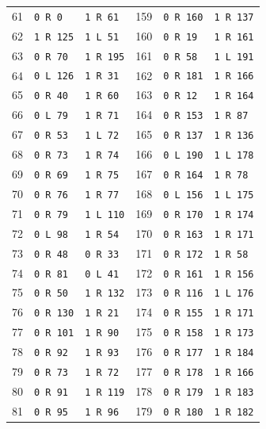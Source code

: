 \begin{longtable}{rll@{\qquad}rll}
61 & \texttt{0 R 0} & \texttt{1 R 61} & 159 & \texttt{0 R 160} & \texttt{1 R 137}\\
62 & \texttt{1 R 125} & \texttt{1 L 51} & 160 & \texttt{0 R 19} & \texttt{1 R 161}\\
63 & \texttt{0 R 70} & \texttt{1 R 195} & 161 & \texttt{0 R 58} & \texttt{1 L 191}\\
64 & \texttt{0 L 126} & \texttt{1 R 31} & 162 & \texttt{0 R 181} & \texttt{1 R 166}\\
65 & \texttt{0 R 40} & \texttt{1 R 60} & 163 & \texttt{0 R 12} & \texttt{1 R 164}\\
66 & \texttt{0 L 79} & \texttt{1 R 71} & 164 & \texttt{0 R 153} & \texttt{1 R 87}\\
67 & \texttt{0 R 53} & \texttt{1 L 72} & 165 & \texttt{0 R 137} & \texttt{1 R 136}\\
68 & \texttt{0 R 73} & \texttt{1 R 74} & 166 & \texttt{0 L 190} & \texttt{1 L 178}\\
69 & \texttt{0 R 69} & \texttt{1 R 75} & 167 & \texttt{0 R 164} & \texttt{1 R 78}\\
70 & \texttt{0 R 76} & \texttt{1 R 77} & 168 & \texttt{0 L 156} & \texttt{1 L 175}\\
71 & \texttt{0 R 79} & \texttt{1 L 110} & 169 & \texttt{0 R 170} & \texttt{1 R 174}\\
72 & \texttt{0 L 98} & \texttt{1 R 54} & 170 & \texttt{0 R 163} & \texttt{1 R 171}\\
73 & \texttt{0 R 48} & \texttt{0 R 33} & 171 & \texttt{0 R 172} & \texttt{1 R 58}\\
74 & \texttt{0 R 81} & \texttt{0 L 41} & 172 & \texttt{0 R 161} & \texttt{1 R 156}\\
75 & \texttt{0 R 50} & \texttt{1 R 132} & 173 & \texttt{0 R 116} & \texttt{1 L 176}\\
76 & \texttt{0 R 130} & \texttt{1 R 21} & 174 & \texttt{0 R 155} & \texttt{1 R 171}\\
77 & \texttt{0 R 101} & \texttt{1 R 90} & 175 & \texttt{0 R 158} & \texttt{1 R 173}\\
78 & \texttt{0 R 92} & \texttt{1 R 93} & 176 & \texttt{0 R 177} & \texttt{1 R 184}\\
79 & \texttt{0 R 73} & \texttt{1 R 72} & 177 & \texttt{0 R 178} & \texttt{1 R 166}\\
80 & \texttt{0 R 91} & \texttt{1 R 119} & 178 & \texttt{0 R 179} & \texttt{1 R 183}\\
81 & \texttt{0 R 95} & \texttt{1 R 96} & 179 & \texttt{0 R 180} & \texttt{1 R 182}\\

\end{longtable}
